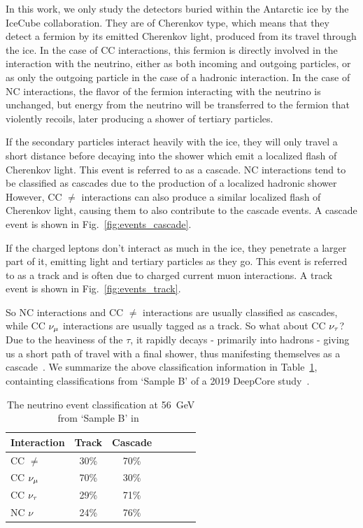 In this work, we only study the detectors buried within the Antarctic ice by the IceCube collaboration. 
They are of Cherenkov type, which means that they detect 
a fermion by its emitted Cherenkov light, produced from its travel through the ice. 
In the case of CC interactions, this fermion is directly involved in the interaction with the neutrino, either as 
both incoming and outgoing particles, or as only the outgoing particle in the case of a hadronic interaction.
In the case of NC interactions, the flavor of the fermion interacting with the neutrino is unchanged, but energy 
from the neutrino will be transferred to the fermion that violently recoils, later producing a shower of tertiary particles. 

If the secondary particles interact heavily with the ice, they will only travel a short distance before decaying 
into the shower which emit a localized flash of Cherenkov light. This event is referred to as a cascade.
NC interactions tend to be classified as cascades due to the production of a localized hadronic shower
However, CC $\ne$ interactions can also produce a similar localized flash of Cherenkov light, causing them to also contribute 
to the cascade events. A cascade event 
is shown in Fig.~\ref{fig:events_cascade}.

If the charged leptons don't interact as much in the ice, they penetrate a larger part of it, emitting light and tertiary particles
as they go. This event is referred to as a track and is often due to charged current muon interactions. A track event 
is shown in Fig.~\ref{fig:events_track}. 


So NC interactions and CC $\ne$ interactions are usually classified as cascades, while CC $\nu_\mu$ interactions are usually tagged 
as a track. So what about CC $\nu_\tau$? Due to the heaviness of the $\tau$, it rapidly decays - primarily into hadrons - giving us a short path
of travel with a final shower, thus manifesting themselves as a cascade~\cite{DC2019tauappearance}. We summarize the above classification 
information in Table~\ref{table:events}, containting classifications from `Sample B' of a 2019 DeepCore study~\cite{DC2019tauappearance}.

\begin{table}[h]
    \begin{center}
        \begin{tabular}{lcccccc}
            \hline \hline
            Interaction &Track &Cascade\\
            \hline
            CC $\ne$ & 30\%& 70\% \\
            CC $\nu_\mu$ & 70\%&30\% \\
            CC $\nu_\tau$ & 29\%& 71\%\\
            NC $\nu$ & 24\%& 76\%\\
            \hline \hline
        \end{tabular}
    \end{center}
    \caption{The neutrino event classification at \SI{56}{\GeV} from `Sample B' in~\cite{DC2019tauappearance}}\label{table:events}
\end{table}


